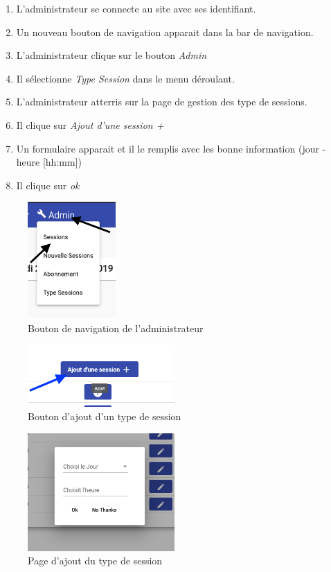 \begin{enumerate}
	\item L'administrateur se connecte au site avec ses identifiant. 
	\item Un nouveau bouton de navigation apparait dans la bar de navigation. 
	\item L'administrateur clique sur le bouton \textit{Admin}
	\item Il sélectionne \textit{Type Session} dans le menu déroulant. 
	\item L'administrateur atterris sur la page de gestion des type de sessions. 
	\item Il clique sur \textit{Ajout d'une session +}
	\item Un formulaire apparait et il le remplis avec les bonne information (jour - heure [hh:mm])
	\item Il clique sur \textit{ok} 
\end{enumerate}

\begin{figure}[h]
	\includegraphics[width=0.3\textwidth,center]{Figures/us11-1}
	\caption{Bouton de navigation de l'administrateur}
\end{figure}

\vspace{\baselineskip}
\vspace{\baselineskip}
\begin{figure}[h]
	\includegraphics[width=0.5\textwidth,center]{Figures/us11-2}
	\caption{Bouton d'ajout d'un type de session}
\end{figure}

\newpage
\begin{figure}[h]
	\includegraphics[width=0.5\textwidth,center]{Figures/us11-3}
	\caption{Page d'ajout du type de session}
\end{figure}



